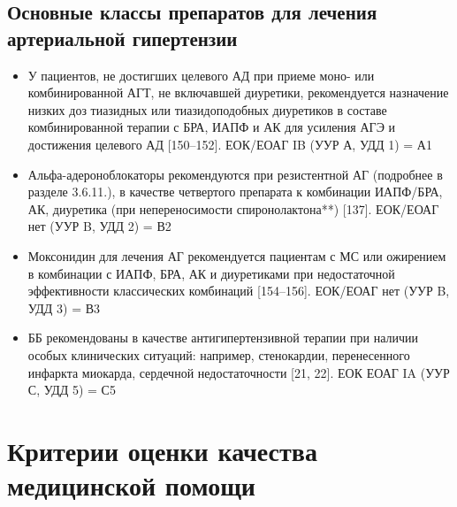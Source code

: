 \documentclass{article}%
\begin{document}
%
\subsection{Основные классы препаратов для лечения артериальной гипертензии}%
\label{subsec:}%
\begin{itemize}%
\item%
У пациентов, не достигших целевого АД при приеме моно{-} или комбинированной АГТ, не включавшей диуретики, рекомендуется назначение низких доз тиазидных или тиазидоподобных диуретиков в составе комбинированной терапии с БРА, ИАПФ и АК для усиления АГЭ и достижения целевого АД {[}150–152{]}.%
\newline%
ЕОК/ЕОАГ IB (УУР А, УДД 1) = А1%
\item%
Альфа{-}адероноблокаторы рекомендуются при резистентной АГ (подробнее в разделе 3.6.11.), в качестве четвертого препарата к комбинации ИАПФ/БРА, АК, диуретика (при непереносимости спиронолактона**) {[}137{]}.%
\newline%
ЕОК/ЕОАГ нет (УУР B, УДД 2) = В2%
\item%
Моксонидин для лечения АГ рекомендуется пациентам с МС или ожирением в комбинации с ИАПФ, БРА, АК и диуретиками при недостаточной эффективности классических комбинаций {[}154–156{]}.%
\newline%
ЕОК/ЕОАГ нет (УУР B, УДД 3) = В3%
\item%
ББ рекомендованы в качестве антигипертензивной терапии при наличии особых клинических ситуаций: например, стенокардии, перенесенного инфаркта миокарда, сердечной недостаточности {[}21, 22{]}.%
\newline%
ЕОК ЕОАГ IA (УУР С, УДД 5) = С5%
\end{itemize}

%
\newpage%
\section{Критерии оценки качества медицинской помощи}%
\label{sec:}%
\end{document}
